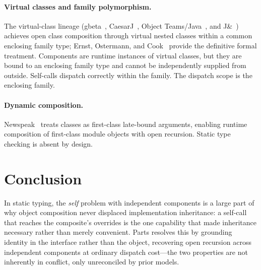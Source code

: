 \documentclass[acmsmall,nonacm]{acmart}
\theoremstyle{acmplain}
\theoremstyle{acmdefinition}
\begin{document}
\paragraph{Virtual classes and family polymorphism.}
The virtual-class lineage (gbeta~\cite{ernst2001}, CaesarJ~\cite{aracic2006},
Object Teams/Java~\cite{herrmann2002}, and J\&~\cite{nystrom2006}) achieves open class composition through virtual nested
classes within a common enclosing family type; Ernst, Ostermann, and
Cook~\cite{ernst2006} provide the definitive formal treatment.
Components are runtime instances of virtual classes, but they are bound to an
enclosing family type and cannot be independently supplied from outside.
Self-calls dispatch correctly within the family. The dispatch scope is the
enclosing family.

\paragraph{Dynamic composition.}
Newspeak~\cite{bracha2010} treats classes as first-class late-bound arguments,
enabling runtime composition of first-class module objects with open
recursion. Static type checking is absent by design.

\section{Conclusion}

In static typing, the \emph{self} problem with independent components is a
large part of why object composition never displaced implementation inheritance:
a self-call that reaches the composite's overrides is the one capability that
made inheritance necessary rather than merely convenient. Parts resolves this by grounding identity in the interface rather than the
object, recovering open recursion across independent components at ordinary
dispatch cost---the two properties are not inherently in conflict, only
unreconciled by prior models.


\end{document}
